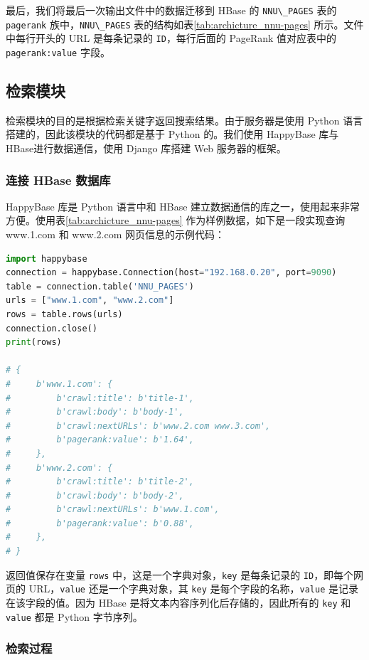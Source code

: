 \documentclass{ctexart}
\newcommand{\code}[1]{\colorbox{backcolor}{\lstinline|#1|}}
\begin{document}
    最后，我们将最后一次输出文件中的数据迁移到 HBase 的 \code{NNU\_PAGES} 表的 \code{pagerank} 族中，\code{NNU\_PAGES} 表的结构如表\ref{tab:archicture_nnu-pages} 所示。文件中每行开头的 URL 是每条记录的 \code{ID}，每行后面的 PageRank 值对应表中的 \code{pagerank:value} 字段。

    \subsection{检索模块}\label{subsec:retrieve}

    检索模块的目的是根据检索关键字返回搜索结果。由于服务器是使用 Python 语言搭建的，因此该模块的代码都是基于 Python 的。我们使用 HappyBase 库\cite{docs-happybase}与 HBase进行数据通信，使用 Django 库\cite{docs-django}搭建 Web 服务器的框架。

    \subsubsection{连接 HBase 数据库}\label{subsubsec:retrieve_connect}

    HappyBase 库是 Python 语言中和 HBase 建立数据通信的库之一，使用起来非常方便。使用表\ref{tab:archicture_nnu-pages} 作为样例数据，如下是一段实现查询 www.1.com 和 www.2.com 网页信息的示例代码：

    \begin{lstlisting}[language=Python]
import happybase
connection = happybase.Connection(host="192.168.0.20", port=9090)
table = connection.table('NNU_PAGES')
urls = ["www.1.com", "www.2.com"]
rows = table.rows(urls)
connection.close()
print(rows)

# {
#     b'www.1.com': {
#         b'crawl:title': b'title-1',
#         b'crawl:body': b'body-1',
#         b'crawl:nextURLs': b'www.2.com www.3.com',
#         b'pagerank:value': b'1.64',
#     },
#     b'www.2.com': {
#         b'crawl:title': b'title-2',
#         b'crawl:body': b'body-2',
#         b'crawl:nextURLs': b'www.1.com',
#         b'pagerank:value': b'0.88',
#     },
# }
    \end{lstlisting}

    返回值保存在变量 \code{rows} 中，这是一个字典对象，\code{key} 是每条记录的 \code{ID}，即每个网页的 URL，\code{value} 还是一个字典对象，其 \code{key} 是每个字段的名称，\code{value} 是记录在该字段的值。因为 HBase 是将文本内容序列化后存储的，因此所有的 \code{key} 和 \code{value} 都是 Python 字节序列。

    \subsubsection{检索过程}\label{subsubsec:retrieve_run}
\end{document}
